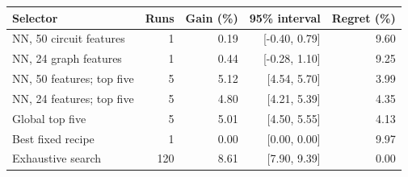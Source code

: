 \begin{tabular}{@{}lrrrr@{}}
\toprule
\textbf{Selector} & \textbf{Runs} & \textbf{Gain (\%)} & \textbf{95\% interval} & \textbf{Regret (\%)} \\
\midrule
NN, 50 circuit features & 1 & 0.19 & [-0.40, 0.79] & 9.60 \\
NN, 24 graph features & 1 & 0.44 & [-0.28, 1.10] & 9.25 \\
NN, 50 features; top five & 5 & 5.12 & [4.54, 5.70] & 3.99 \\
NN, 24 features; top five & 5 & 4.80 & [4.21, 5.39] & 4.35 \\
Global top five & 5 & 5.01 & [4.50, 5.55] & 4.13 \\
Best fixed recipe & 1 & 0.00 & [0.00, 0.00] & 9.97 \\
Exhaustive search & 120 & 8.61 & [7.90, 9.39] & 0.00 \\
\bottomrule
\end{tabular}
